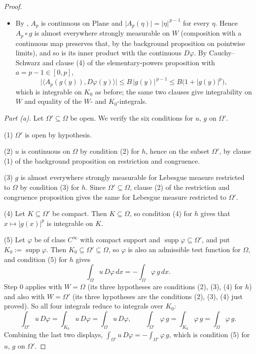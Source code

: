 \begin{proof}
\begin{itemize}
integrability proposition makes it integrable on $K_0$; it vanishes off $K_0$, so clause (4)
gives integrability on $W$ and $\int_W\varphi\,g=\int_{K_0}\varphi\,g$.
\item By , $A_p$ is continuous on $\mathrm{Plane}$ and
$\lvert A_p(\eta)\rvert=\lvert\eta\rvert^{\,p-1}$ for every $\eta$.  Hence $A_p\circ g$ is
almost everywhere strongly measurable on $W$ (composition with a continuous map preserves that,
by the background proposition on pointwise limits), and so is its inner product with the
continuous $D\varphi$.  By Cauchy--Schwarz and clause (4) of the elementary-powers proposition
with $a=p-1\in[0,p]$,
\[
  \bigl\lvert\bigl\langle A_p(g(y)),D\varphi(y)\bigr\rangle\bigr\rvert
  \le B\,\lvert g(y)\rvert^{\,p-1}\le B\bigl(1+\lvert g(y)\rvert^{p}\bigr),
\]
which is integrable on $K_0$ as before; the same two clauses give integrability on $W$ and
equality of the $W$- and $K_0$-integrals.
\end{itemize}

\medskip\noindent\emph{Part (a).}
Let $\Omega'\subseteq\Omega$ be open.  We verify the six conditions for $u$, $g$ on $\Omega'$.

(1) $\Omega'$ is open by hypothesis.

(2) $u$ is continuous on $\Omega$ by condition (2) for $h$, hence on the subset $\Omega'$, by
clause (1) of the background proposition on restriction and congruence.

(3) $g$ is almost everywhere strongly measurable for Lebesgue measure restricted to $\Omega$ by
condition (3) for $h$.  Since $\Omega'\subseteq\Omega$, clause (2) of the restriction and
congruence proposition gives the same for Lebesgue measure restricted to $\Omega'$.

(4) Let $K\subseteq\Omega'$ be compact.  Then $K\subseteq\Omega$, so condition (4) for $h$ gives
that $x\mapsto\lvert g(x)\rvert^{p}$ is integrable on $K$.

(5) Let $\varphi$ be of class $C^\infty$ with compact support and
$\operatorname{supp}\varphi\subseteq\Omega'$, and put $K_0:=\operatorname{supp}\varphi$.  Then
$K_0\subseteq\Omega'\subseteq\Omega$, so $\varphi$ is also an admissible test function for
$\Omega$, and condition (5) for $h$ gives
\[
  \int_\Omega u\,D\varphi\,dx=-\int_\Omega\varphi\,g\,dx .
\]
Step 0 applies with $W=\Omega$ (its three hypotheses are conditions (2), (3), (4) for $h$) and
also with $W=\Omega'$ (its three hypotheses are the conditions (2), (3), (4) just proved).  So
all four integrals reduce to integrals over $K_0$:
\[
  \int_{\Omega'}u\,D\varphi=\int_{K_0}u\,D\varphi=\int_\Omega u\,D\varphi,
  \qquad
  \int_{\Omega'}\varphi\,g=\int_{K_0}\varphi\,g=\int_\Omega\varphi\,g .
\]
Combining the last two displays, $\int_{\Omega'}u\,D\varphi=-\int_{\Omega'}\varphi\,g$, which
is condition (5) for $u$, $g$ on $\Omega'$.


\end{proof}
